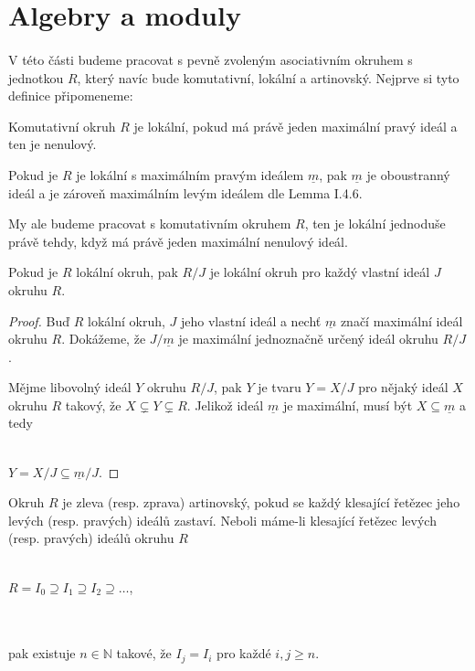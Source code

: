 \section{Algebry a moduly}\label{algebry-moduly}

  \paragraph{ }V této části budeme pracovat s pevně zvoleným
  asociativním okruhem s jednotkou $R$, který navíc bude 
  komutativní, lokální a artinovský. Nejprve si tyto definice připomeneme:
    
  \begin{dfn}
    Komutativní okruh $R$ je lokální, pokud má právě jeden maximální pravý ideál a ten je nenulový.
  \end{dfn}
  
  Pokud je $R$ je lokální s maximálním pravým ideálem $\underline 
  m$, pak $\underline m$ je oboustranný ideál a je zároveň maximálním 
  levým ideálem dle \cite{1} Lemma I.4.6.
  
  My ale budeme pracovat s komutativním okruhem $R$, ten je 
  lokální jednoduše právě tehdy, 
  když má právě jeden maximální nenulový ideál.
  
  \begin{lem}\label{faktor-lokalniho-lokalni}
    Pokud je $R$ lokální okruh, pak $R/J$ je lokální okruh pro každý vlastní 
    ideál $J$ okruhu $R$.
  \end{lem}
  \begin{proof}
    Buď $R$ lokální okruh, $J$ jeho vlastní ideál a nechť $\underline{m}$ 
    značí maximální ideál okruhu $R$. Dokážeme, že $J/\underline{m}$ je 
    maximální jednoznačně určený ideál okruhu $R/J$.
    
    Mějme libovolný ideál $Y$ okruhu $R/J$, pak $Y$ je tvaru $Y=X/J$ pro nějaký 
    ideál $X$ okruhu $R$ takový, že $X\subsetneq Y\subsetneq R$. 
    Jelikož ideál $\underline{m}$ 
    je maximální, musí být $X\subseteq \underline{m}$ a tedy \\\\
    \centerline{$Y=X/J \subseteq \underline{m}/J$.}
  \end{proof}
  
  \begin{dfn}
    Okruh $R$ je zleva (resp. zprava) artinovský, pokud se každý klesající 
    řetězec jeho levých (resp. pravých) ideálů zastaví. Neboli máme-li klesající řetězec 
    levých (resp. pravých) ideálů okruhu $R$ \\\\
    \centerline{$R=I_0\supseteq I_1\supseteq I_2\supseteq\ldots$,} \\\\
    pak existuje $n\in \mathbb{N}$ takové, že $I_j=I_i$ pro každé $i,j\geq n$.
  \end{dfn}
  
